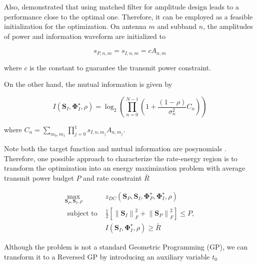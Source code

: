 Also, \cite{Clerckx2017} demonstrated that using matched filter for amplitude design leads to a performance close to the optimal one. Therefore, it can be employed as a feasible initialization for the optimization. On antenna $m$ and subband $n$, the amplitudes of power and information waveform are initialized to

\begin{equation}\label{eqn:initial_amplitude}
  {s_{P,n,m}} = {s_{I,n,m}} = c{A_{n,m}}
\end{equation}

where $c$ is the constant to guarantee the transmit power constraint.

On the other hand, the mutual information is given by

\begin{equation}\label{eqn:mutual_information_posynomial}
  I\left( {{{\mathbf{S}}_I},{\mathbf{\Phi }}_I^ \star ,\rho } \right) = {\log _2}\left( {\prod\limits_{n = 0}^{N - 1} {\left( {1 + \frac{{(1 - \rho )}}{{\sigma _n^2}}{C_n}} \right)} } \right)
\end{equation}

where ${C_n} = \sum\nolimits_{{m_0},{m_1}} {\prod\nolimits_{j = 0}^1 {{s_{I,n,{m_j}}}{A_{n,{m_j}}}} } $.

Note both the target function and mutual information are posynomials \cite{Boyd2007}. Therefore, one possible approach to characterize the rate-energy region is to transform the optimization into an energy maximization problem with average transmit power budget $P$ and rate constraint ${\bar R}$

\begin{eqnarray}
  {\mathop {\max }\limits_{{{\mathbf{S}}_P},{{\mathbf{S}}_I},\rho } }&{{z_{DC}}\left( {{{\mathbf{S}}_P},{{\mathbf{S}}_I},{\mathbf{\Phi }}_P^ \star ,{\mathbf{\Phi }}_I^ \star ,\rho } \right)} \label{eqn:original_target}\\
  {{\text{ subject to }}}&{\frac{1}{2}\left[ {\left\| {{{\mathbf{S}}_I}} \right\|_F^2 + \left\| {{{\mathbf{S}}_P}} \right\|_F^2} \right] \leqslant P,} \label{eqn:original_power_constraint} \\
  {}&{I\left( {{{\mathbf{S}}_I},{\mathbf{\Phi }}_I^ \star ,\rho } \right) \geqslant \bar R} \label{eqn:original_rate_constraint}
\end{eqnarray}

Although the problem is not a standard Geometric Programming (GP), we can transform it to a Reversed GP by introducing an auxiliary variable ${t_0}$ \cite{Chiang2005}

